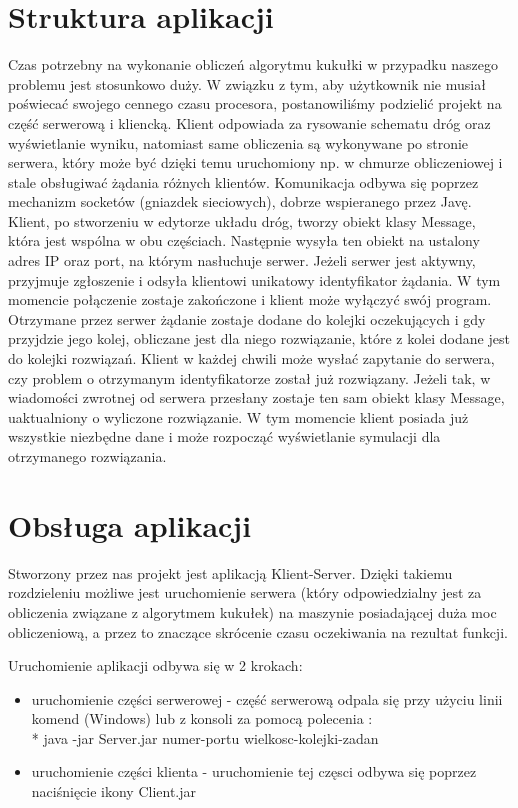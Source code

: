 \documentclass{article}
\begin{document}
\section{Struktura aplikacji}
Czas potrzebny na wykonanie obliczeń algorytmu kukułki w przypadku naszego problemu jest stosunkowo duży. W związku z tym, aby użytkownik nie musiał poświecać swojego cennego czasu procesora, postanowiliśmy podzielić projekt na część serwerową i kliencką. Klient odpowiada za rysowanie schematu dróg oraz wyświetlanie wyniku, natomiast same obliczenia są wykonywane po stronie serwera, który może być dzięki temu uruchomiony np. w chmurze obliczeniowej i stale obsługiwać żądania różnych klientów. 
Komunikacja odbywa się poprzez mechanizm socketów (gniazdek sieciowych), dobrze wspieranego przez Javę. Klient, po stworzeniu w edytorze układu dróg, tworzy obiekt klasy Message, która jest wspólna w obu częściach. Następnie wysyła ten obiekt na ustalony adres IP oraz port, na którym nasłuchuje serwer. Jeżeli serwer jest aktywny, przyjmuje zgłoszenie i odsyła klientowi unikatowy identyfikator żądania. W tym momencie połączenie zostaje zakończone i klient może wyłączyć swój program. 
Otrzymane przez serwer żądanie zostaje dodane do kolejki oczekujących i gdy przyjdzie jego kolej, obliczane jest dla niego rozwiązanie, które z kolei dodane jest do kolejki rozwiązań. Klient w każdej chwili może wysłać zapytanie do serwera, czy problem o otrzymanym identyfikatorze został już rozwiązany. Jeżeli tak, w wiadomości zwrotnej od serwera przesłany zostaje ten sam obiekt klasy Message, uaktualniony o wyliczone rozwiązanie. 
W tym momencie klient posiada już wszystkie niezbędne dane i może rozpocząć wyświetlanie symulacji dla otrzymanego rozwiązania. 

\section{Obsługa aplikacji}
  Stworzony przez nas projekt jest aplikacją Klient-Server. Dzięki takiemu rozdzieleniu możliwe jest uruchomienie serwera (który odpowiedzialny jest za obliczenia związane z algorytmem kukułek) na maszynie posiadającej duża moc obliczeniową, a przez to znaczące skrócenie czasu oczekiwania na rezultat funkcji.

Uruchomienie aplikacji odbywa się w 2 krokach:
\begin{itemize}
\item uruchomienie części serwerowej - część serwerową odpala się przy użyciu linii komend (Windows) lub z konsoli za pomocą polecenia :\\*
 java -jar Server.jar numer-portu wielkosc-kolejki-zadan
\item uruchomienie części klienta - uruchomienie tej częsci odbywa się poprzez naciśnięcie ikony Client.jar
\end{itemize}
\end{document}
